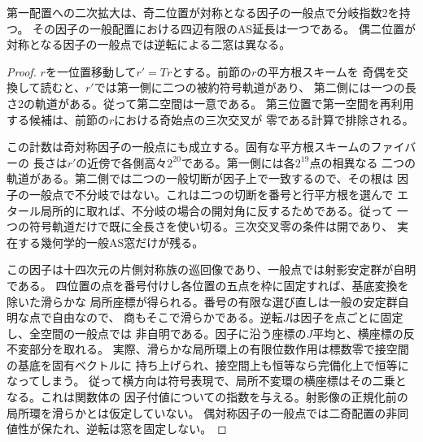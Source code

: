 \begin{corollary}\label{cor:orientation-ramification}
第一配置への二次拡大は、奇二位置が対称となる因子の一般点で分岐指数2を持つ。
その因子の一般配置における四辺有限のAS延長は一つである。
偶二位置が対称となる因子の一般点では逆転による二窓は異なる。
\end{corollary}
\begin{proof}
$r$を一位置移動して$r'=Tr$とする。前節の$r$の平方根スキームを
奇偶を交換して読むと、$r'$では第一側に二つの被約符号軌道があり、
第二側には一つの長さ2の軌道がある。従って第二空間は一意である。
第三位置で第一空間を再利用する候補は、前節の$r$における奇始点の三次交叉が
零である計算で排除される。

この計数は奇対称因子の一般点にも成立する。固有な平方根スキームのファイバーの
長さは$r'$の近傍で各側高々$2^{20}$である。第一側には各$2^{19}$点の相異なる
二つの軌道がある。第二側では二つの一般切断が因子上で一致するので、その根は
因子の一般点で不分岐ではない。これは二つの切断を番号と行平方根を選んで
エタール局所的に取れば、不分岐の場合の開対角に反するためである。従って
一つの符号軌道だけで既に全長さを使い切る。三次交叉零の条件は開であり、
実在する幾何学的一般AS窓だけが残る。

この因子は十四次元の片側対称族の巡回像であり、一般点では射影安定群が自明である。
四位置の点を番号付けし各位置の五点を枠に固定すれば、基底変換を除いた滑らかな
局所座標が得られる。番号の有限な選び直しは一般の安定群自明な点で自由なので、
商もそこで滑らかである。逆転$J$は因子を点ごとに固定し、全空間の一般点では
非自明である。因子に沿う座標の$J$平均と、横座標の反不変部分を取れる。
実際、滑らかな局所環上の有限位数作用は標数零で接空間の基底を固有ベクトルに
持ち上げられ、接空間上も恒等なら完備化上で恒等になってしまう。
従って横方向は符号表現で、局所不変環の横座標はその二乗となる。これは関数体の
因子付値についての指数を与える。射影像の正規化前の局所環を滑らかとは仮定していない。
偶対称因子の一般点では二奇配置の非同値性が保たれ、逆転は窓を固定しない。
\end{proof}
